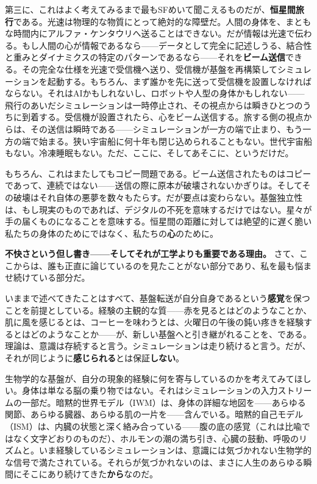 \documentclass[11pt, twoside, openright]{book}
\begin{document}
第三に、これはよく考えてみるまで最もSFめいて聞こえるものだが、\textbf{恒星間旅行}である。光速は物理的な物質にとって絶対的な障壁だ。人間の身体を、まともな時間内にアルファ・ケンタウリへ送ることはできない。だが情報は光速で伝わる。もし人間の心が情報であるなら------データとして完全に記述しうる、結合性と重みとダイナミクスの特定のパターンであるなら------それを\textbf{ビーム送信}できる。その完全な仕様を光速で受信機へ送り、受信機が基盤を再構築してシミュレーションを起動する。もちろん、まず誰かを先に送って受信機を設置しなければならない。それはAIかもしれないし、ロボットや人型の身体かもしれない------飛行のあいだシミュレーションは一時停止され、その視点からは瞬きひとつのうちに到着する。受信機が設置されたら、心をビーム送信する。旅する側の視点からは、その送信は瞬時である------シミュレーションが一方の端で止まり、もう一方の端で始まる。狭い宇宙船に何十年も閉じ込められることもない。世代宇宙船もない。冷凍睡眠もない。ただ、ここに、そしてあそこに、というだけだ。

もちろん、これはまたしてもコピー問題である。ビーム送信されたものはコピーであって、連続ではない------送信の際に原本が破壊されないかぎりは。そしてその破壊はそれ自体の悪夢を数々もたらす。だが要点は変わらない。基盤独立性は、もし現実のものであれば、デジタルの不死を意味するだけではない。星々が手の届くものになることを意味する。恒星間の距離に対しては絶望的に遅く脆い私たちの身体のためにではなく、私たちの\textbf{心}のために。

\textbf{不快さという但し書き------そしてそれが工学よりも重要である理由。} さて、ここからは、誰も正直に論じているのを見たことがない部分であり、私を最も悩ませ続けている部分だ。

いままで述べてきたことはすべて、基盤転送が自分自身であるという\textbf{感覚}を保つことを前提としている。経験の主観的な質------赤を見るとはどのようなことか、肌に風を感じるとは、コーヒーを味わうとは、火曜日の午後の鈍い疼きを経験するとはどのようなことか------が、新しい基盤へと引き継がれることを、である。理論は、意識は存続すると言う。シミュレーションは走り続けると言う。だが、それが同じように\textbf{感じられる}とは保証\textbf{しない}。

生物学的な基盤が、自分の現象的経験に何を寄与しているのかを考えてみてほしい。身体は単なる脳の乗り物ではない。それはシミュレーションの入力ストリームの一部だ。暗黙的世界モデル（IWM）は、身体の詳細な地図を------あらゆる関節、あらゆる臓器、あらゆる肌の一片を------含んでいる。暗黙的自己モデル（ISM）は、内臓の状態と深く絡み合っている------腹の底の感覚（これは比喩ではなく文字どおりのものだ）、ホルモンの潮の満ち引き、心臓の鼓動、呼吸のリズムと。いま経験しているシミュレーションは、意識には気づかれない生物学的な信号で満たされている。それらが気づかれないのは、まさに人生のあらゆる瞬間にそこにあり続けてきた\textbf{から}なのだ。
\end{document}
